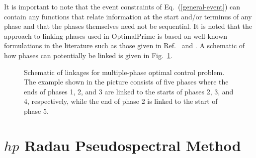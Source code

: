 \documentclass[prodmode,acmtecs]{acmsmall}
\begin{document}
It is important to note that the event constraints of
Eq.~(\ref{general-event}) can contain any functions that relate
information at the start and/or terminus of any phase and that the
phases themselves need not be sequential.  It is noted that the
approach to linking phases used in OptimalPrime is based on well-known
formulations in the literature such as those given in
Ref.~ and .   A schematic of how phases
can potentially be linked is given in Fig.~\ref{fig: linkages}.
\begin{figure}[h]
  \centering
  \caption{Schematic of linkages for multiple-phase optimal control problem.
    The example shown in the picture consists of five phases where the ends of
    phases 1, 2, and 3 are linked to the starts of phases 2, 3, and 4,
    respectively, while the end of phase 2 is linked to the start of phase 5.
    \label{fig: linkages}}
\end{figure}

\section{$hp$ Radau Pseudospectral Method}
\end{document}
